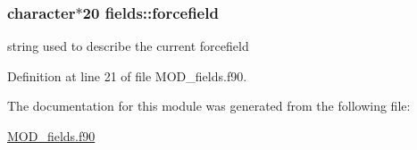 \hypertarget{classfields_ab26757b26ed2dd825a8f566c3bed28f2}{
\subsubsection[{forcefield}]{\setlength{\rightskip}{0pt plus 5cm}character$\ast$20 fields\-::forcefield}}\label{classfields_ab26757b26ed2dd825a8f566c3bed28f2}


string used to describe the current forcefield 



Definition at line 21 of file M\-O\-D\-\_\-fields.\-f90.



The documentation for this module was generated from the following file\-:\begin{DoxyCompactItemize}
\item 
\hyperlink{MOD__fields_8f90}{M\-O\-D\-\_\-fields.\-f90}\end{DoxyCompactItemize}
